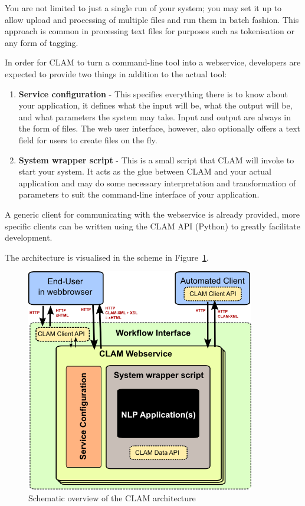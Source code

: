 \documentclass[11pt]{article}
\begin{document}
You are not limited to just a single run of your system; you may set it up to
allow upload and processing of multiple files and run them in batch fashion.
This approach is common in processing text files for purposes such as
tokenisation or any form of tagging.

In order for CLAM to turn a command-line tool into a webservice, developers are
expected to provide two things in addition to the actual tool: 

\begin{enumerate}
  \item \textbf{Service configuration} - This specifies everything there is to
    know about your application, it defines what the input will be, what
    the output will be, and what parameters the system may take. Input and output
    are always in the form of files. The web user interface, however, also
    optionally offers a text field for users to create files on the fly.
    
  \item \textbf{System wrapper script} - This is a small script that CLAM will
    invoke to start your system. It acts as the glue between CLAM and your
    actual application and may do some necessary interpretation and
    transformation of parameters to suit the command-line interface of your
    application.
\end{enumerate}

A generic client for communicating with the webservice is already provided,
more specific clients can be written using the CLAM API (Python) to greatly
facilitate development.

The architecture is visualised in the scheme in Figure~\ref{fig:arch}.

\begin{figure}[h]
\begin{center}
\includegraphics[width=100.0mm]{architecture.png}
\end{center}
\caption{Schematic overview of the CLAM architecture}
\label{fig:arch} 
\end{figure}
\end{document}
